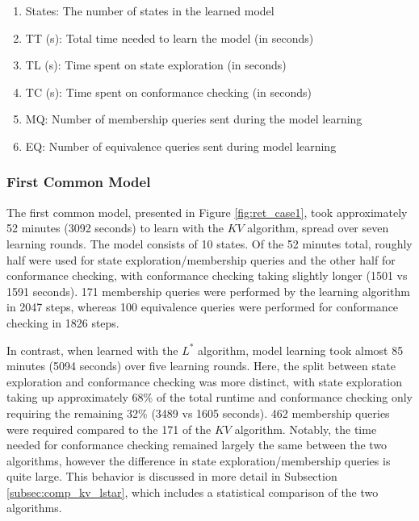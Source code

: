 \begin{enumerate}
	\item States: The number of states in the learned model
	\item TT (s): Total time needed to learn the model (in seconds)
	\item TL (s): Time spent on state exploration (in seconds)
	\item TC (s): Time spent on conformance checking (in seconds)
	\item MQ: Number of membership queries sent during the model learning
	\item EQ: Number of equivalence queries sent during model learning
\end{enumerate}
 

\subsubsection*{First Common Model}

The first common model, presented in Figure \ref{fig:ret_case1}, took approximately 52 minutes (3092 seconds) to learn with the $KV$ algorithm, spread over seven learning rounds. The model consists of 10 states. Of the 52 minutes total, roughly half were used for state exploration/membership queries and the other half for conformance checking, with conformance checking taking slightly longer (1501 vs 1591 seconds). 171 membership queries were performed by the learning algorithm in 2047 steps, whereas 100 equivalence queries were performed for conformance checking in 1826 steps.

In contrast, when learned with the $L^*$ algorithm, model learning took almost 85 minutes (5094 seconds) over five learning rounds. Here, the split between state exploration and conformance checking was more distinct, with state exploration taking up approximately 68\% of the total runtime and conformance checking only requiring the remaining 32\% (3489 vs 1605 seconds). 462 membership queries were required compared to the 171 of the $KV$ algorithm. Notably, the time needed for conformance checking remained largely the same between the two algorithms, however the difference in state exploration/membership queries is quite large. This behavior is discussed in more detail in Subsection \ref{subsec:comp_kv_lstar}, which includes a statistical comparison of the two algorithms.

